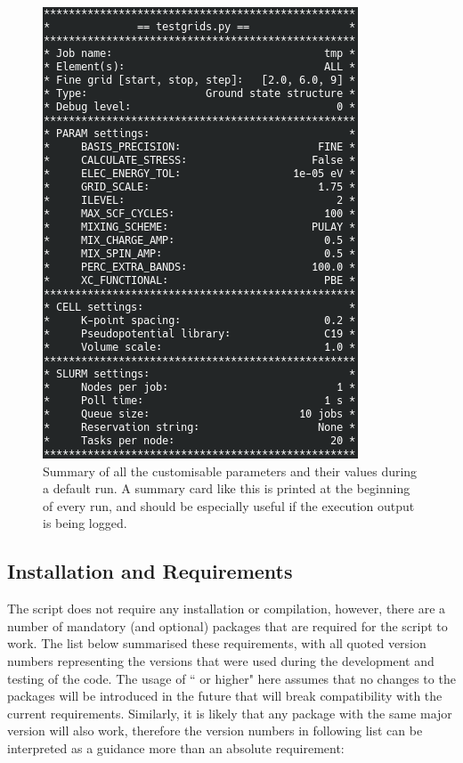 \begin{figure}[h]
    \centering
    \includegraphics{testgrids_default.png}
    \caption{Summary of all the customisable parameters and their values during a default run. A summary card like this is printed at the beginning of every run, and should be especially useful if the execution output is being logged.}
    \label{fig:testgrids_default}
\end{figure}

\subsection{Installation and Requirements}

The  script does not require any installation or compilation, however, there are a number of mandatory (and optional) packages that are required for the script to work. The list below summarised these requirements, with all quoted version numbers representing the versions that were used during the development and testing of the code. The usage of `` or higher" here assumes that no changes to the packages will be introduced in the future that will break compatibility with the current requirements. Similarly, it is likely that any package with the same major version will also work, therefore the version numbers in following list can be interpreted as a guidance more than an absolute requirement:

